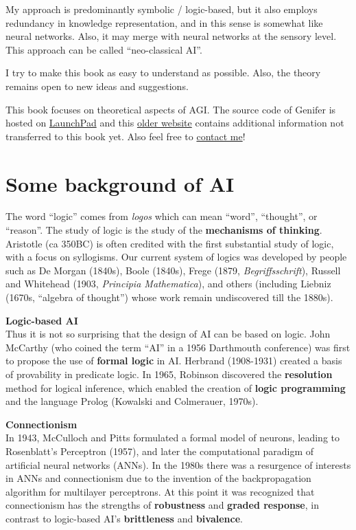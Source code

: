 \documentclass[a4paper]{report}
\begin{document}
\leftskip 0cm
My approach is predominantly symbolic / logic-based, but it also employs redundancy in knowledge representation, and in this sense is somewhat like neural networks.  Also, it may merge with neural networks at the sensory level.  This approach can be called ``neo-classical AI''.

I try to make this book as easy to understand as possible.  Also, the theory remains open to new ideas and suggestions.

This book focuses on theoretical aspects of AGI.  The source code of $\mbox{Genifer}$ is hosted on \href{http://launchpad.net/genifer}{LaunchPad} and this \href{http://www.geocities.com/genericAI}{older website} contains additional information not transferred to this book yet.  Also feel free to \href{mailto:Generic.Intelligence@Gmail.com}{contact me}!

\section{Some background of AI}

The word ``logic'' comes from \textit{logos} which can mean ``word'', ``thought'', or ``reason''.  The study of logic is the study of the \textbf{mechanisms of thinking}.  Aristotle (ca 350BC) is often credited with the first substantial study of logic, with a focus on syllogisms.  Our current system of logics was developed by people such as De Morgan (1840s), Boole (1840s), Frege (1879, \textit{Begriffsschrift}), Russell and Whitehead (1903, \textit{Principia Mathematica}), and others (including Liebniz (1670s, ``algebra of thought'') whose work remain undiscovered till the 1880s).

\textbf{Logic-based AI}\\
Thus it is not so surprising that the design of AI can be based on logic.  John McCarthy (who coined the term ``AI'' in a 1956 Darthmouth conference) was first to propose the use of \textbf{formal logic} in AI.  Herbrand (1908-1931) created a basis of provability in predicate logic.  In 1965, Robinson discovered the \textbf{resolution} method for logical inference, which enabled the creation of \textbf{logic programming} and the language Prolog (Kowalski and Colmerauer, 1970s).

\textbf{Connectionism}\\
In 1943, McCulloch and Pitts formulated a formal model of neurons, leading to Rosenblatt's Perceptron (1957), and later the computational paradigm of artificial neural networks (ANNs).  In the 1980s there was a resurgence of interests in ANNs and connectionism due to the invention of the backpropagation algorithm for multilayer perceptrons.  At this point it was recognized that connectionism has the strengths of \textbf{robustness} and \textbf{graded response}, in contrast to logic-based AI's \textbf{brittleness} and \textbf{bivalence}.
\end{document}
